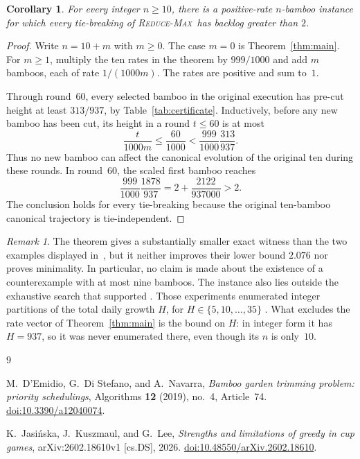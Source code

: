 \documentclass[11pt]{amsart}
\newtheorem{corollary}[theorem]{Corollary}
\theoremstyle{remark}
\newtheorem{remark}[theorem]{Remark}
\newcommand{\RM}{\textnormal{\textsc{Reduce-Max}}}
\begin{document}
\begin{corollary}\label{cor:alln}
For every integer $n\ge10$, there is a positive-rate $n$-bamboo
instance for which every tie-breaking of \RM\ has backlog greater
than $2$.
\end{corollary}

\begin{proof}
Write $n=10+m$ with $m\ge0$. The case $m=0$ is
Theorem~\ref{thm:main}. For $m\ge1$, multiply the ten rates in the
theorem by $999/1000$ and add $m$ bamboos, each of rate
$1/(1000m)$. The rates are positive and sum to~$1$.

Through round~$60$, every selected bamboo in the original execution
has pre-cut height at least $313/937$, by
Table~\ref{tab:certificate}. Inductively, before any new bamboo has
been cut, its height in a round $t\le60$ is at most
\[
\frac{t}{1000m}\le\frac{60}{1000}
<\frac{999}{1000}\frac{313}{937}.
\]
Thus no new bamboo can affect the canonical evolution of the original
ten during these rounds. In round~$60$, the scaled first bamboo
reaches
\[
\frac{999}{1000}\frac{1878}{937}
=2+\frac{2122}{937000}>2.
\]
The conclusion holds for every tie-breaking because the original
ten-bamboo canonical trajectory is tie-independent.
\end{proof}

\begin{remark}
The theorem gives a substantially smaller exact witness than the two
examples displayed in~\cite{JKL26}, but it neither improves their
lower bound $2.076$ nor proves minimality. In particular, no claim is
made about the existence of a counterexample with at most nine
bamboos. The instance also lies outside the exhaustive search that
supported \cite[Conjecture~1]{DDN19}. Those experiments enumerated
integer partitions of the total daily growth $H$, for
$H\in\{5,10,\dots,35\}$
\cite[Sections~4.1 and~4.2]{DDN19}. What excludes the rate vector of
Theorem~\ref{thm:main} is the bound on $H$: in integer form it has
$H=937$, so it was never enumerated there, even though its $n$ is
only~$10$.
\end{remark}

\begin{thebibliography}{9}

M.~D'Emidio, G.~Di Stefano, and A.~Navarra,
\emph{Bamboo garden trimming problem: priority schedulings},
Algorithms \textbf{12} (2019), no.~4, Article~74.
\href{https://doi.org/10.3390/a12040074}
{doi:10.3390/a12040074}.

K.~Jasi\'nska, J.~Kuszmaul, and G.~Lee,
\emph{Strengths and limitations of greedy in cup games},
arXiv:2602.18610v1 [cs.DS], 2026.
\href{https://doi.org/10.48550/arXiv.2602.18610}
{doi:10.48550/arXiv.2602.18610}.

\end{thebibliography}
\end{document}
